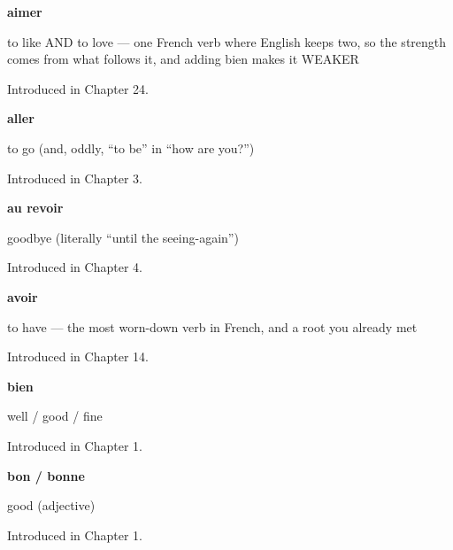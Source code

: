 \noindent\begin{minipage}[t]{\linewidth}
\raggedright
\textbf{aimer}\par
\small to like AND to love — one French verb where English keeps two, so the strength comes from what follows it, and adding bien makes it WEAKER\par
\footnotesize Introduced in Chapter 24.
\end{minipage}\par\medskip

\noindent\begin{minipage}[t]{\linewidth}
\raggedright
\textbf{aller}\par
\small to go (and, oddly, \textquotedblleft{}to be\textquotedblright{} in \textquotedblleft{}how are you?\textquotedblright{})\par
\footnotesize Introduced in Chapter 3.
\end{minipage}\par\medskip

\noindent\begin{minipage}[t]{\linewidth}
\raggedright
\textbf{au revoir}\par
\small goodbye (literally \textquotedblleft{}until the seeing-again\textquotedblright{})\par
\footnotesize Introduced in Chapter 4.
\end{minipage}\par\medskip

\noindent\begin{minipage}[t]{\linewidth}
\raggedright
\textbf{avoir}\par
\small to have — the most worn-down verb in French, and a root you already met\par
\footnotesize Introduced in Chapter 14.
\end{minipage}\par\medskip

\noindent\begin{minipage}[t]{\linewidth}
\raggedright
\textbf{bien}\par
\small well / good / fine\par
\footnotesize Introduced in Chapter 1.
\end{minipage}\par\medskip

\noindent\begin{minipage}[t]{\linewidth}
\raggedright
\textbf{bon / bonne}\par
\small good (adjective)\par
\footnotesize Introduced in Chapter 1.
\end{minipage}\par\medskip

